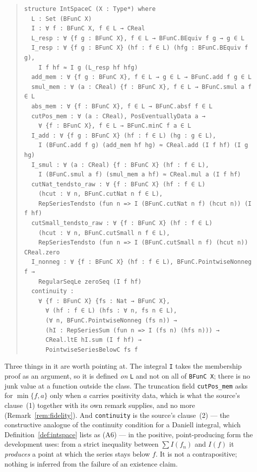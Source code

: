 \documentclass[11pt]{article}
\theoremstyle{definition}
\theoremstyle{remark}
\begin{document}
\begin{quote}\small
\begin{verbatim}
structure IntSpaceC (X : Type*) where
  L : Set (BFunC X)
  I : ∀ f : BFunC X, f ∈ L → CReal
  L_resp : ∀ {f g : BFunC X}, f ∈ L → BFunC.BEquiv f g → g ∈ L
  I_resp : ∀ {f g : BFunC X} (hf : f ∈ L) (hfg : BFunC.BEquiv f g),
    I f hf ≈ I g (L_resp hf hfg)
  add_mem : ∀ {f g : BFunC X}, f ∈ L → g ∈ L → BFunC.add f g ∈ L
  smul_mem : ∀ (a : CReal) {f : BFunC X}, f ∈ L → BFunC.smul a f ∈ L
  abs_mem : ∀ {f : BFunC X}, f ∈ L → BFunC.absf f ∈ L
  cutPos_mem : ∀ (a : CReal), PosEventuallyData a →
    ∀ {f : BFunC X}, f ∈ L → BFunC.minC f a ∈ L
  I_add : ∀ {f g : BFunC X} (hf : f ∈ L) (hg : g ∈ L),
    I (BFunC.add f g) (add_mem hf hg) ≈ CReal.add (I f hf) (I g hg)
  I_smul : ∀ (a : CReal) {f : BFunC X} (hf : f ∈ L),
    I (BFunC.smul a f) (smul_mem a hf) ≈ CReal.mul a (I f hf)
  cutNat_tendsto_raw : ∀ {f : BFunC X} (hf : f ∈ L)
    (hcut : ∀ n, BFunC.cutNat n f ∈ L),
    RepSeriesTendsto (fun n => I (BFunC.cutNat n f) (hcut n)) (I f hf)
  cutSmall_tendsto_raw : ∀ {f : BFunC X} (hf : f ∈ L)
    (hcut : ∀ n, BFunC.cutSmall n f ∈ L),
    RepSeriesTendsto (fun n => I (BFunC.cutSmall n f) (hcut n)) CReal.zero
  I_nonneg : ∀ {f : BFunC X} (hf : f ∈ L), BFunC.PointwiseNonneg f →
    RegularSeqLe zeroSeq (I f hf)
  continuity :
    ∀ {f : BFunC X} {fs : Nat → BFunC X},
      ∀ (hf : f ∈ L) (hfs : ∀ n, fs n ∈ L),
      (∀ n, BFunC.PointwiseNonneg (fs n)) →
      (hI : RepSeriesSum (fun n => I (fs n) (hfs n))) →
      CReal.ltE hI.sum (I f hf) →
      PointwiseSeriesBelowC fs f
\end{verbatim}
\end{quote}

\noindent Three things in it are worth pointing at. The integral \texttt{I} takes
the membership proof as an argument, so it is defined \emph{on} \texttt{L} and not
on all of \texttt{BFunC X}; there is no junk value at a function outside the class.
The truncation field \texttt{cutPos\_mem} asks for $\min\{f,a\}$ only when $a$ carries
positivity data, which is what the source's clause~(1) together with its own remark
supplies, and no more (Remark~\ref{rem:fidelity}). And \texttt{continuity} is the
source's clause~(2) --- the constructive analogue of the continuity condition for a
Daniell integral, which Definition~\ref{def:intspace} lists as (A6) --- in the positive,
point-producing form the development uses: from a strict inequality between $\sum I(f_n)$
and $I(f)$ it \emph{produces} a point at which the series stays below $f$.  It is not a
contrapositive; nothing is inferred from the failure of an existence claim.
\end{document}
